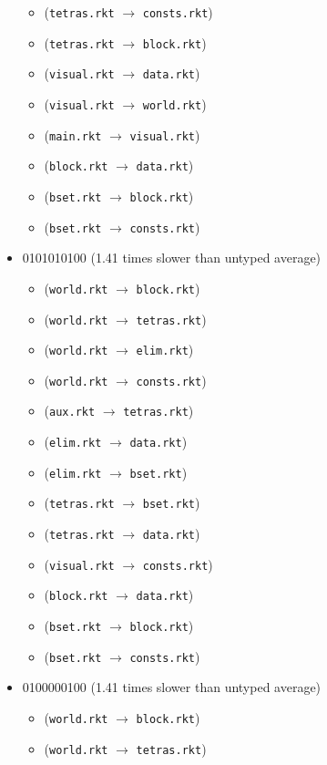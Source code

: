 \documentclass{article}
\newcommand{\mono}[1]{\texttt{#1}}
\begin{document}
\begin{itemize}
\begin{itemize}
  \item (\mono{tetras.rkt} $\rightarrow$ \mono{consts.rkt})
  \item (\mono{tetras.rkt} $\rightarrow$ \mono{block.rkt})
  \item (\mono{visual.rkt} $\rightarrow$ \mono{data.rkt})
  \item (\mono{visual.rkt} $\rightarrow$ \mono{world.rkt})
  \item (\mono{main.rkt} $\rightarrow$ \mono{visual.rkt})
  \item (\mono{block.rkt} $\rightarrow$ \mono{data.rkt})
  \item (\mono{bset.rkt} $\rightarrow$ \mono{block.rkt})
  \item (\mono{bset.rkt} $\rightarrow$ \mono{consts.rkt})
  \end{itemize}
\item 0101010100 (1.41 times slower than untyped average)
  \begin{itemize}
  \item (\mono{world.rkt} $\rightarrow$ \mono{block.rkt})
  \item (\mono{world.rkt} $\rightarrow$ \mono{tetras.rkt})
  \item (\mono{world.rkt} $\rightarrow$ \mono{elim.rkt})
  \item (\mono{world.rkt} $\rightarrow$ \mono{consts.rkt})
  \item (\mono{aux.rkt} $\rightarrow$ \mono{tetras.rkt})
  \item (\mono{elim.rkt} $\rightarrow$ \mono{data.rkt})
  \item (\mono{elim.rkt} $\rightarrow$ \mono{bset.rkt})
  \item (\mono{tetras.rkt} $\rightarrow$ \mono{bset.rkt})
  \item (\mono{tetras.rkt} $\rightarrow$ \mono{data.rkt})
  \item (\mono{visual.rkt} $\rightarrow$ \mono{consts.rkt})
  \item (\mono{block.rkt} $\rightarrow$ \mono{data.rkt})
  \item (\mono{bset.rkt} $\rightarrow$ \mono{block.rkt})
  \item (\mono{bset.rkt} $\rightarrow$ \mono{consts.rkt})
  \end{itemize}
\item 0100000100 (1.41 times slower than untyped average)
  \begin{itemize}
  \item (\mono{world.rkt} $\rightarrow$ \mono{block.rkt})
  \item (\mono{world.rkt} $\rightarrow$ \mono{tetras.rkt})

\end{itemize}
\end{itemize}
\end{document}

